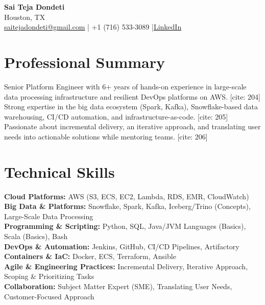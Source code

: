 \documentclass[10pt]{article}
\begin{document}
\begin{center}
    {\LARGE \textbf{Sai Teja Dondeti}} \\
    \vspace{2pt}
    Houston, TX \\
    \href{mailto:saitejadondeti@gmail.com}{saitejadondeti@gmail.com} \;|\;
    +1 (716) 533-3089 \;|\; [cite: 203]
    \href{https://www.linkedin.com/in/sai-teja-dondeti/}{LinkedIn}
\end{center}

\section*{Professional Summary}
Senior Platform Engineer with 6+ years of hands-on experience in large-scale data processing infrastructure and resilient DevOps platforms on AWS. [cite: 204] Strong expertise in the big data ecosystem (Spark, Kafka), Snowflake-based data warehousing, CI/CD automation, and infrastructure-as-code. [cite: 205] Passionate about incremental delivery, an iterative approach, and translating user needs into actionable solutions while mentoring teams. [cite: 206]

\section*{Technical Skills}

\textbf{Cloud Platforms:} AWS (S3, ECS, EC2, Lambda, RDS, EMR, CloudWatch) \\
\textbf{Big Data \& Platforms:} Snowflake, Spark, Kafka, Iceberg/Trino (Concepts), Large-Scale Data Processing \\
\textbf{Programming \& Scripting:} Python, SQL, Java/JVM Languages (Basics), Scala (Basics), Bash \\
\textbf{DevOps \& Automation:} Jenkins, GitHub, CI/CD Pipelines, Artifactory \\
\textbf{Containers \& IaC:} Docker, ECS, Terraform, Ansible \\
\textbf{Agile \& Engineering Practices:} Incremental Delivery, Iterative Approach, Scoping \& Prioritizing Tasks \\
\textbf{Collaboration:} Subject Matter Expert (SME), Translating User Needs, Customer-Focused Approach

\end{document}
